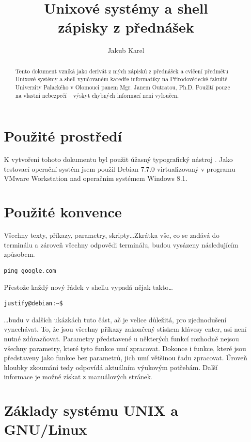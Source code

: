 \documentclass{article}
\title{\Huge{Unixové systémy a shell}\\ \vspace{1em} \normalsize{zápisky z přednášek}}
\author{Jakub Karel}
\begin{document}
\maketitle
\begin{abstract}
Tento dokument vzniká jako derivát z mých zápisků z přednášek a cvičení předmětu Unixové systémy a shell vyučovaném {\Large katedře informatiky na Přírodovědecké fakultě Univerzity Palackého v Olomouci} panem Mgr. Janem Outratou, Ph.D. Použití pouze na vlastní nebezpečí -- výskyt chybných informací není vyloučen.
\end{abstract}

\thispagestyle{empty}
\newpage
\thispagestyle{empty}
\tableofcontents
\thispagestyle{empty}
\newpage

\setcounter{page}{1}
\section{Použité prostředí}
K vytvoření tohoto dokumentu byl použit úžasný typografický nástroj \LaTeXe. Jako testovací operační systém jsem použil Debian 7.7.0 virtualizovaný v programu VMware Workstation nad operačním systémem Windows 8.1.

\section{Použité konvence}
Všechny texty, příkazy, parametry, skripty\dots Zkrátka vše, co se zadává do terminálu a zároveň všechny odpovědi terminálu, budou vysázeny následujícím způsobem. 
\begin{verbatim}
ping google.com
\end{verbatim}
Přestože každý nový řádek v shellu vypadá nějak takto\dots
\begin{verbatim}
justify@debian:~$ 
\end{verbatim}
\dots budu v dalších ukázkách tuto část, ač je velice důležitá, pro zjednodušení vynechávat. To, že jsou všechny příkazy zakončený stiskem klávesy enter, asi není nutné zdůrazňovat. Parametry představené u některých funkcí rozhodně nejsou všechny parametry, které tyto funkce umí zpracovat. Dokonce i funkce, které jsou představeny jako funkce bez parametrů, jich umí většinou řadu zpracovat. Úroveň hloubky zkoumání tedy odpovídá aktuálním výukovým potřebám. Další informace je možné získat z manuálových stránek.
\newpage

\section{Základy systému UNIX a GNU/Linux}
\end{document}
